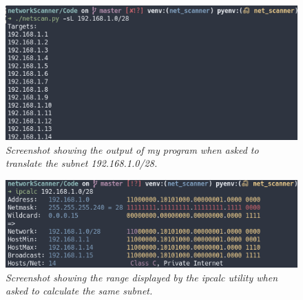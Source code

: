 \documentclass[titlepage]{article}
\begin{document}
\begin{figure}[H]
  \centering
  \includegraphics[width=\textwidth]{iplist.png}
  \caption{\textit{%
    Screenshot showing the output of my program when asked to translate the subnet 192.168.1.0/28.
}}\label{cidrtest}
\end{figure}

\begin{figure}[H]
  \centering
  \includegraphics[width=\textwidth]{ipcalclist.png}
  \caption{\textit{%
    Screenshot showing the range displayed by the ipcalc utility when asked to calculate
    the same subnet.
}}\label{cidrwebproof}
\end{figure}
\end{document}
